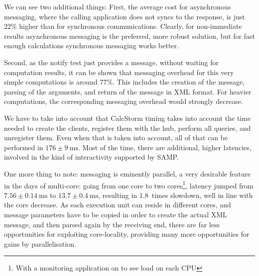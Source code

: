 		We can see two additional things: First, the average cost
		for asynchronous messaging, where the calling application
		does not syncs to the response, is just 22\% higher than
		for synchronous communications. Clearly, for non-immediate
		results asynchronous messaging is the preferred, more
		robust solution, but for fast enough calculations
		synchronous messaging works better.
		
		Second, as the notify test just provides a message,
		without waiting for computation results, it can be shown
		that messaging overhead for this very simple computations
		is around 77\%. This includes the creation of the message,
		parsing of the arguments, and return of the message in XML
		format. For heavier computations, the corresponding
		messaging overhead would strongly decrease.
		
		
		We have to take into account that CalcStorm timing takes
		into account the time needed to create the clients,
		register them with the hub, perform all queries, and
		unregister them. Even when that is taken into account, all
		of that can be performed in $176\pm9~\textrm{ms}$. Most of
		the time, there are additional, higher latencies, involved
		in the kind of interactivity supported by SAMP.
		
		One more thing to note: messaging is eminently parallel, a
		very desirable feature in the days of multi-core: going
		from one core to two cores\footnote{With a monitoring
		application on to see load on each CPU}, latency jumped
		from $7.56\pm0.14~\textrm{ms}$ to $13.7\pm0.4~\textrm{ms}$,
		resulting in 1.8~times slowdown, well in line with the core
		decrease. As each execution unit can reside in different
		cores, and message parameters have to be copied in order to
		create the actual XML message, and then parsed again by the
		receiving end, there are far less opportunities for
		exploiting core-locality, providing many more opportunities
		for gains by parallelisation.
		
